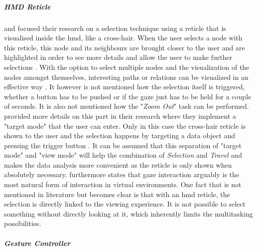 \subparagraph{HMD Reticle}

\cite{Kwon2015} and \cite{Drouhard2015} focused their research on a selection technique using a reticle that is visualised inside the \gls{hmd}, like a cross-hair. When the user selects a node with this reticle, this node and its neighbours are brought closer to the user and are highlighted in order to see more details and allow the user to make further selections \citep{Kwon2015}. With the option to select multiple nodes and the visualization of the nodes amongst themselves, interesting paths or relations can be visualized in an effective way \citep{Kwon2015}. It however is not mentioned how the selection itself is triggered, whether a button has to be pushed or if the gaze just has to be held for a couple of seconds. It is also not mentioned how the "\textit{Zoom Out}" task can be performed. \newline
\cite{Drouhard2015} provided more details on this part in their research where they implement a "target mode" that the user can enter. Only in this case the cross-hair reticle is shown to the user and the selection happens by targeting a data object and pressing the trigger button \citep{Drouhard2015}. It can be assumed that this separation of "target mode" and "view mode" will help the combination of \textit{Selection} and \textit{Travel} and makes the data analysis more convenient as the reticle is only shown when absolutely necessary. \newline
\cite{Drouhard2015} furthermore states that gaze interaction arguably is the most natural form of interaction in virtual environments. \newline
One fact that is not mentioned in literature but becomes clear is that with an \gls{hmd} reticle, the selection is directly linked to the viewing experience. It is not possible to select something without directly looking at it, which inherently limits the multitasking possibilities.


\subparagraph{Gesture Controller}

